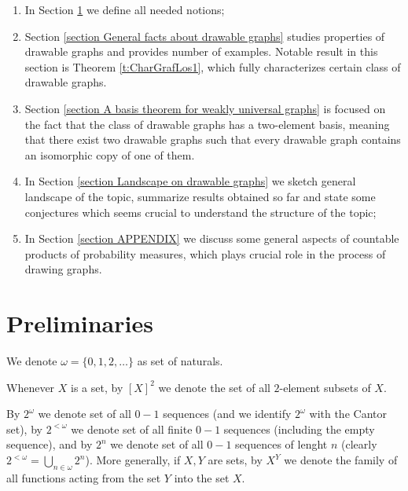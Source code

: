 \documentclass{amsart}
\theoremstyle{plain}
\theoremstyle{definition}
\theoremstyle{remark}
\numberwithin{equation}{section}
\begin{document}
\begin{enumerate}
\item In Section \ref{section Preliminaries} we define all needed notions;
\item Section \ref{section General facts about drawable graphs} studies properties of drawable graphs and provides number of examples. Notable result in this section is Theorem \ref{t:CharGrafLos1}, which fully characterizes certain class of drawable graphs.
\item Section \ref{section A basis theorem for weakly universal graphs} is focused on the fact that the class of drawable graphs has a two-element basis, meaning that there
exist two drawable graphs such that every drawable graph contains an isomorphic copy of one of them.
\item In Section \ref{section Landscape on drawable graphs} we sketch general landscape of the topic, summarize results obtained so far and state some conjectures which seems crucial to understand the structure of the topic;
\item In Section \ref{section APPENDIX} we discuss some general aspects of countable products of probability measures, which plays crucial role in the process of drawing graphs.
\end{enumerate}



\section{Preliminaries}\label{section Preliminaries}
We denote $\omega=\{0,1,2,\ldots\} $ as set of naturals. 

Whenever $X$ is a set, by $[X]^2$ we denote the set of all $2$-element subsets of $X$. 

By $2^\omega$ we denote set of all $0-1$ sequences (and we identify $2^\omega$ with the Cantor set), by $2^{<\omega}$ we denote set of all finite $0-1$ sequences (including the empty sequence), and by $2^n$ we denote set of all $0-1$ sequences of lenght $n$ (clearly $2^{<\omega}=\bigcup_{n\in \omega} 2^n $). More generally, if $X,Y$ are sets, by $X^Y$ we denote the family of all functions acting from the set $Y$ into the set $X$. 
\end{document}
